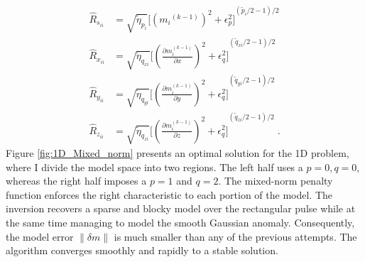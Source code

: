 \begin{equation}
\begin{split}
{\hat R}_{s_{ii}}  &= \sqrt{\tilde \eta_{p_i}}{\Big[ {({m_i}^{(k-1)})}^{2} + \epsilon^2_{p} \Big]}^{({\tilde p_i}/2 - 1)/2} \\
{\hat R}_{x_{ii}}  &= \sqrt{\tilde \eta_{q_{xi}}}{\Big[ {\left ({\frac{\partial m_i^{(k-1)} }{\partial x}}\right)}^{2} + \epsilon_q^2 \Big]}^{({\tilde q_{xi}}/2 - 1)/2}  \\
{\hat R}_{y_{ii}}  &= \sqrt{\tilde \eta_{q_{yi}}}{\Big[ {\left ({\frac{\partial m_i^{(k-1)} }{\partial y}}\right)}^{2} + \epsilon_q^2 \Big]}^{({\tilde q_{yi}}/2 - 1)/2}  \\
{\hat R}_{z_{ii}}  &= \sqrt{\tilde \eta_{q_{zi}}}{\Big[ {\left ({\frac{\partial m_i^{(k-1)} }{\partial z}}\right)}^{2} + \epsilon_q^2 \Big]}^{({\tilde q_{zi}}/2 - 1)/2}  \;.
 \end{split}
\end{equation}
Figure \ref{fig:1D_Mixed_norm} presents an optimal solution for the 1D problem, where I divide the model space into two regions.
The left half uses a $p=0, q=0$, whereas the right half imposes a $p=1$ and $q=2$.
The mixed-norm penalty function enforces the right characteristic to each portion of the model. 
The inversion recovers a sparse and blocky model over the rectangular pulse while at the same time managing to model the smooth Gaussian anomaly.
Consequently, the model error $\|\delta m\|$ is much smaller than any of the previous attempts.
The algorithm converges smoothly and rapidly to a stable solution.

